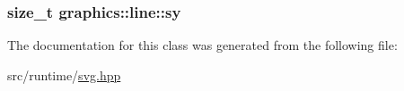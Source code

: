 \subsubsection[{\texorpdfstring{sy}{sy}}]{\setlength{\rightskip}{0pt plus 5cm}size\+\_\+t graphics\+::line\+::sy\hspace{0.3cm}{\ttfamily [private]}}\hypertarget{classgraphics_1_1line_ac4c6f1e0eccd02b3399d091736c0903c}{}\label{classgraphics_1_1line_ac4c6f1e0eccd02b3399d091736c0903c}


The documentation for this class was generated from the following file\+:\begin{DoxyCompactItemize}
\item 
src/runtime/\hyperlink{svg_8hpp}{svg.\+hpp}\end{DoxyCompactItemize}
